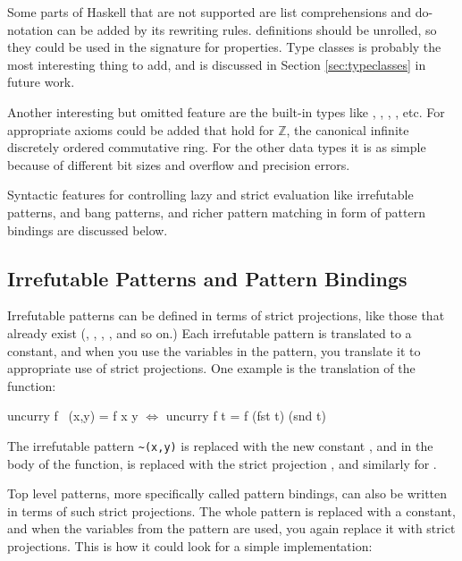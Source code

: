 Some parts of Haskell that are not supported are list
comprehensions and do-notation can be added by its rewriting rules.
 definitions should be unrolled, so they could be used in
the signature for properties. Type classes is probably the most
interesting thing to add, and is discussed in Section
\ref{sec:typeclasses} in future work.

Another interesting but omitted feature are the built-in types like
, , , , etc. For 
appropriate axioms could be added that hold for $\mathbb{Z}$, the
canonical infinite discretely ordered commutative ring. For the other
data types it is as simple because of different bit sizes and overflow
and precision errors.

Syntactic features for controlling lazy and strict evaluation like
irrefutable patterns,  and bang patterns, and richer pattern
matching in form of pattern bindings are discussed below.

\begin{comment}
 It should be
noted that it is already possible to prove a lot of interesting
Haskell properties, it is far from able to prove things about bigger
Haskell projects which usually use a richer part of the language.
\end{comment}

\subsection{Irrefutable Patterns and Pattern Bindings}

Irrefutable patterns can be defined in terms of strict projections,
like those that already exist (, , ,
, and so on.) Each irrefutable pattern is translated to a
constant, and when you use the variables in the pattern, you translate
it to appropriate use of strict projections. One example is the
translation of the  function:

\begin{code}[mathescape]
uncurry f ~(x,y) = f x y        $\Leftrightarrow$      uncurry f t = f (fst t) (snd t)
\end{code}

\noindent
The irrefutable pattern \verb:~(x,y): is replaced with the new constant
, and in the body of the function,  is replaced with the
strict projection , and similarly for .

Top level patterns, more specifically called pattern bindings, can
also be written in terms of such strict projections. The whole pattern
is replaced with a constant, and when the variables from the pattern
are used, you again replace it with strict projections. This is how it
could look for a simple  implementation:

